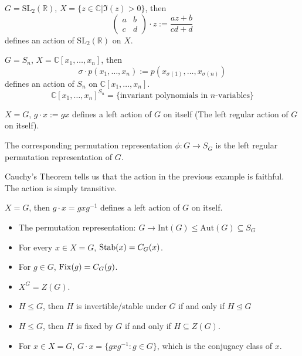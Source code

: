 \documentclass{article}
\begin{document}
\begin{example}
    $G=\text{SL}_2(\mathbb{R})$, $X=\{z\in \mathbb{C}|\Im(z)>0\}$, then
    \begin{equation*}
        \begin{pmatrix}
            a&b\\c&d
        \end{pmatrix} \cdot z := \frac{az+b}{cd+d}
    \end{equation*}
    defines an action of $\text{SL}_2(\mathbb{R})$ on $X$.
\end{example}
\begin{example}
    $G=S_n$, $X=\mathbb{C}[x_1,\dots,x_n]$, then
    \begin{equation*}
        \sigma\cdot p(x_1,\dots,x_n):=p(x_{\sigma(1)},\dots,x_{\sigma(n)})
    \end{equation*}
    defines an action of $S_n$ on $\mathbb{C}[x_1,\dots,x_n]$.
    \begin{equation*}
        \mathbb{C}[x_1,\dots,x_n]^{S_n} =\{\text{invariant polynomials in $n$-variables}\}
    \end{equation*}
\end{example}
\begin{example}
    $X=G$, $g\cdot x:= gx$ defines a left action of $G$ on itself (The left regular action of $G$ on itself).

    The corresponding permutation representation $\phi:G\rightarrow S_G$ is the left regular permutation representation of $G$.
\end{example}
\begin{idea}
    Cauchy's Theorem tells us that the action in the previous example is faithful. The action is simply transitive.
\end{idea}
\begin{example}
    $X=G$, then $g\cdot x=gxg^{-1}$ defines a left action of $G$ on itself.
    \begin{itemize}
        \item The permutation representation: $G\rightarrow \text{Int}(G) \le \text{Aut}(G) \subseteq S_G$
        \item For every $x\in X=G$, $\operatorname{Stab}(x)=C_G(x)$.
        \item For $g\in G$, $\operatorname{Fix}(g)=C_G(g)$.
        \item $X^G=Z(G)$.
        \item $H\le G$, then $H$ is invertible/stable under $G$ if and only if $H \trianglelefteq G$
        \item $H \le G$, then $H$ is fixed by $G$ if and only if $H \subseteq Z(G)$.
        \item For $x\in X=G$, $G\cdot x = \{gxg^{-1}:g\in G\}$, which is the conjugacy class of $x$.
    \end{itemize}
\end{example}
\end{document}
